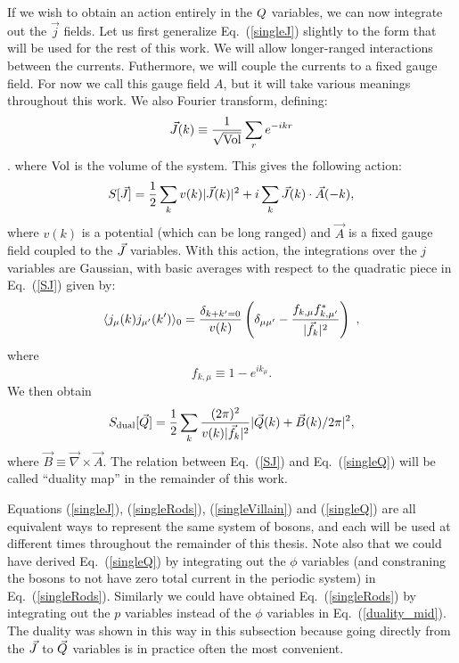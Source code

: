 If we wish to obtain an action entirely in the $Q$ variables, we can now integrate out the $\vec{j}$ fields. Let us first generalize Eq.~(\ref{singleJ}) slightly to the form that will be used for the rest of this work. We will allow longer-ranged interactions between the currents. Futhermore, we will couple the currents to a fixed gauge field. For now we call this gauge field $A$, but it will take various meanings throughout this work. We also Fourier transform, defining:
\begin{equation}
\vec{J}(k)\equiv \frac{1}{\sqrt{\rm Vol}} \sum_r e^{-ikr}
\label{fourier_def}
\end{equation}. 
where ${\rm Vol}$ is the volume of the system. This gives the following action:
\begin{eqnarray}
S[\vec{J}]=\frac{1}{2}\sum_{k} v(k) |\vec{J}(k)|^2 + i\sum_k  \vec{J}(k)\cdot \vec{A}(-k),
\label{SJ}
\end{eqnarray}
where $v(k)$ is a potential (which can be long ranged) and $\vec{A}$ is a fixed gauge field coupled to the $\vec{J}$ variables. 
With this action, the integrations over the $j$ variables are Gaussian, with basic averages with respect to the quadratic piece in Eq.~(\ref{SJ}) given by:
\begin{equation}
\langle j_\mu(k) j_{\mu'}(k') \rangle_0 = \frac{\delta_{k+k'=0}}{v(k)} \left(\delta_{\mu \mu'} - \frac{f_{k,\mu} f_{k,\mu'}^*}{|\vec{f}_k|^2} \right) ~,
\end{equation}
 where 
 \begin{equation}
 f_{k,\mu} \equiv 1 - e^{i k_\mu}.
 \end{equation}
  We then obtain
\begin{equation}
S_{\rm dual}[\vec{Q}] = \frac{1}{2} \sum_k \frac{(2\pi)^2}{v(k) |\vec{f}_k|^2} |\vec{Q}(k) + \vec{B}(k)/2\pi|^2,
\label{singleQ}
\end{equation}
where $\vec{B} \equiv \vec{\nabla} \times \vec{A}$.  The relation between Eq.~(\ref{SJ}) and Eq.~(\ref{singleQ}) will be called ``duality map'' in the remainder of this work. 

Equations (\ref{singleJ}), (\ref{singleRods}), (\ref{singleVillain}) and (\ref{singleQ}) are all equivalent ways to represent the same system of bosons, and each will be used at different times throughout the remainder of this thesis. Note also that we could have derived Eq.~(\ref{singleQ}) by integrating out the $\phi$ variables (and constraning the bosons to not have zero total current in the periodic system) in Eq.~(\ref{singleRods}). Similarly we could have obtained Eq.~(\ref{singleRods}) by integrating out the $p$ variables instead of the $\phi$ variables in Eq.~(\ref{duality_mid}). The duality was shown in this way in this subsection because going directly from the $\vec{J}$ to $\vec{Q}$ variables is in practice often the most convenient.

